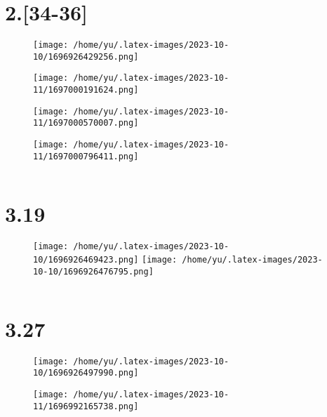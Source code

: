 \documentclass[14pt]{extarticle}
\begin{document}
\vspace*{0pt}
\section{2.[34-36]}
\begin{figure}[H]
    \centering
    \texttt{[image: /home/yu/.latex-images/2023-10-10/1696926429256.png]}
\end{figure}
\begin{figure}[H]
    \centering
    \texttt{[image: /home/yu/.latex-images/2023-10-11/1697000191624.png]}
\end{figure}
\begin{figure}[H]
    \centering
    \texttt{[image: /home/yu/.latex-images/2023-10-11/1697000570007.png]}
\end{figure}
\begin{figure}[H]
    \centering
    \texttt{[image: /home/yu/.latex-images/2023-10-11/1697000796411.png]}
\end{figure}

\inputminted{cpp}{2.34-36.cpp}


\section{3.19}
\begin{figure}[H]
    \centering
    \texttt{[image: /home/yu/.latex-images/2023-10-10/1696926469423.png]}
    \texttt{[image: /home/yu/.latex-images/2023-10-10/1696926476795.png]}
\end{figure}

\inputminted{cpp}{3.19.cpp}


\section{3.27}
\begin{figure}[H]
    \centering
    \texttt{[image: /home/yu/.latex-images/2023-10-10/1696926497990.png]}
\end{figure}
\begin{figure}[H]
    \centering
    \texttt{[image: /home/yu/.latex-images/2023-10-11/1696992165738.png]}
\end{figure}

\inputminted{cpp}{3.27.cpp}
\end{document}
